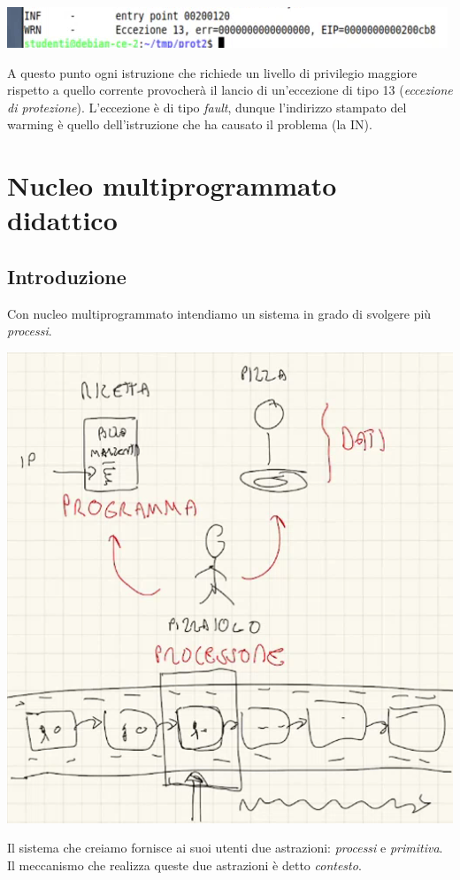 \documentclass[11pt]{report}
\theoremstyle{definition}
\begin{document}
\begin{center}\includegraphics{img/123.PNG}\end{center}
A questo punto ogni istruzione che richiede un livello di privilegio maggiore rispetto a quello corrente provocherà il lancio di un'eccezione di tipo 13 (\emph{eccezione di protezione}). L'eccezione è di tipo \emph{fault}, dunque l'indirizzo stampato del warming è quello dell'istruzione che ha causato il problema (la IN). 

\part{Nucleo multiprogrammato didattico}

\chapter{Introduzione}
Con nucleo multiprogrammato intendiamo un sistema in grado di svolgere più \emph{processi}.
\begin{center}\includegraphics[scale=.80]{img/124.PNG}\end{center}
Il sistema che creiamo fornisce ai suoi utenti due astrazioni: \emph{processi} e \emph{primitiva}. Il meccanismo che realizza queste due astrazioni è detto \emph{contesto}.
\end{document}
